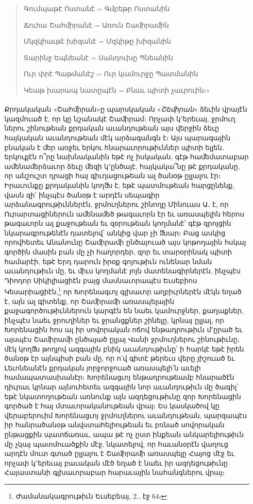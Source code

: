 \documentclass{article}
\begin{document}
{\begin{quotation}
Գումպաթէ Ոստանէ = Գմբեթր Ոստանին

Ճուհա Շահﬕրանէ = Առուն Շաﬕրաﬕն

Մկզկիաւթէ խիզանէ = Մզկիթը խիզանին

Տարինջ Եպնեանէ = Սանդուխը Պնեանին

Ուր փրէ Պաթմանէշ = Ուր կամուրջը Պատմանին

Կեաթ խարապ նատըպէն = Բնաւ պիտի չաւրուին։»
\end{quotation}
\paragraph{}
Քրդակական «Շահﬕրան»ը պարսկական «\emph{Շեﬕրան}» ձեւին վրայէն կազմուած է, որ կը նշանակէ Շաﬕրամ։ Որչափ կ՚երեւայ, ջրմուղ ներու շինութեան քրդական աւանդութեան այս վերջին ձեւը հայկական աւանդութեան մէկ արձագանգն է։ Այս պարագային բնական է ﬔր առջեւ երկու հնարաւորութիւններ պիտի ելլեն․ երկուքէն ո՞րը նախնականին եթէ ոչ իսկական, գէթ հաﬔմատաբար աﬔնաﬔրձաւոր ձեւը ﬔզի կ՚ընծայէ, հայկակա՞նը թէ քրդականը, որ անշուշտ դրացի հայ գիւղացութեան ալ ծանօթ ըլլալու էր։ Իրաւունքը քրդականին կողﬓ է, եթէ պատմութեան հարցընենք, վասն զի՝ ինչպէս ծանօթ է արդէն սեպագիր արձանագրութիւններէն, ջրմուղներու շինողը Մինուաս Ա․ է, որ Ուրարտացիներուն աﬔնաﬔծ թագաւորն էր եւ առասպելին հերոս թագաւորն ալ քաջութեան եւ զօրութեան կողմանէ՝ գէթ զրոյցին նկարագրութենէն դատելով՝ անկից վար չի ﬓար։ Բաց ասկից որովհետեւ Անանունը Շաﬕրաﬕ ընծայուած այս կոթողային հսկայ գործին մասին բան մը չի հաղորդեր, զոր եւ տարօրինակ պիտի համարէի, եթէ Երդ դարուն իրօք գոյութիւն ունենար նման աւանդութիւն մը, եւ ﬕւս կողմանէ յոյն մատենագիրներէն, ինչպէս Դիոդոր Սիկիլիացիէն բայց մասնաւորապէս Եւսեբիոս Կեսարիացիէն,\footnote{Ժամանակագրութիւն Եւսեբեայ, 2., էջ 64։} որ Խորենագւոյ գլխաւոր աղբիւրներէն մէկն եղած է, այն ալ գիտենք, որ Շաﬕրաﬕ առասպելային քաջագործութիւններուն կարգէն են նաեւ կամուրջներ, քաղաքներ, ինչպէս նաեւ ջրուղիներ եւ ջրանցքներ շինելը, կրնայ ըլլալ, որ Խորենացին հոս ալ իր սովորական ոճով ենթադրութիւն մ՚ըրած եւ այսպէս Շաﬕրաﬕ ընծայած ըլլայ Վանի ջրմուղներու շինութիւնը, մէկ կողﬓ թողլով ազգային բնիկ աւանդութիւնը՝ ի հարկէ եթէ իրեն ծանօթ էր այնպիսի բան մը, որ ո՛վ գիտէ թերեւս վերը յիշուած եւ Լեւոնեանէն քրդական յորջորջուած առասպելի՛ն աւելի համապատասխանէր։ Խորենացւոյ ենթադրութեամբ հնարածէն դիւրաւ կրնար այնուհետեւ ազգային նոր աւանդութիւն մը ծագիլ՝ եթէ նկատողութեան առնունք այն ազդեցութիւնը զոր Խորենացին գործած է հայ մտաւորականութեան վրայ։ Ես կասկածով կը վերաբերուիմ Խորենացւոյ ջրմուղներու աւանդութեան, պարզապէս իր հանրածանօթ անվստահելիութեան եւ բռնած սովորական ընթացքին պատճառաւ, ապա թէ ոչ ըստ ինքեան անկարելիութիւն մը չկայ պատմուածքին մէջ, նկատելով, որ հաւանօրէն վաղուց արդէն մուտ գտած ըլլալու է Շաﬕրաﬕ առասպելը Հայոց մէջ եւ որչափ կ՚երեւայ բաւական մէծ եղած է նաեւ իր ազդեցութիւնը Հայաստանի գլխաւորաբար հարաւային նահանգներու վրայ։

}
\end{document}

